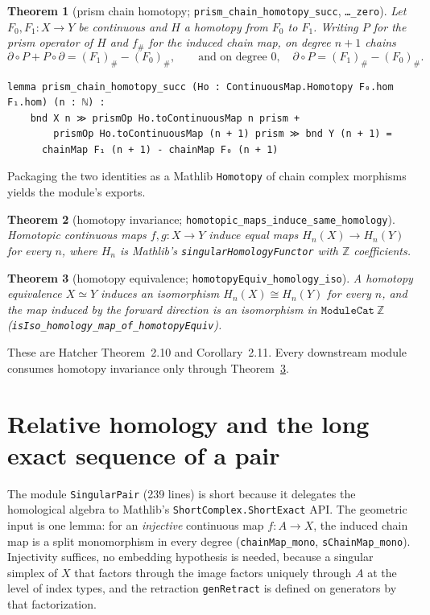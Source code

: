 \documentclass[11pt]{article}
\newtheorem{theorem}{Theorem}[section]
\theoremstyle{remark}
\newcommand{\Z}{\mathbb{Z}}
\newcommand{\leanname}[1]{\texttt{#1}}
\begin{document}
\begin{theorem}[prism chain homotopy;
\leanname{prism\_chain\_homotopy\_succ}, \leanname{\dots\_zero}]
\label{thm:prism}
Let $F_0, F_1 : X \to Y$ be continuous and $H$ a homotopy from $F_0$ to
$F_1$. Writing $P$ for the prism operator of $H$ and $f_\#$ for the induced
chain map, on degree $n+1$ chains
\[
\partial \circ P + P \circ \partial = (F_1)_\# - (F_0)_\#,
\qquad\text{and on degree } 0,\quad
\partial \circ P = (F_1)_\# - (F_0)_\#.
\]
\end{theorem}

\begin{lstlisting}
lemma prism_chain_homotopy_succ (Ho : ContinuousMap.Homotopy F₀.hom F₁.hom) (n : ℕ) :
    bnd X n ≫ prismOp Ho.toContinuousMap n prism +
        prismOp Ho.toContinuousMap (n + 1) prism ≫ bnd Y (n + 1) =
      chainMap F₁ (n + 1) - chainMap F₀ (n + 1)
\end{lstlisting}

Packaging the two identities as a Mathlib \leanname{Homotopy} of chain
complex morphisms yields the module's exports.

\begin{theorem}[homotopy invariance;
\leanname{homotopic\_maps\_induce\_same\_homology}]\label{thm:hinv}
Homotopic continuous maps $f, g : X \to Y$ induce equal maps
$H_n(X) \to H_n(Y)$ for every $n$, where $H_n$ is Mathlib's
\leanname{singularHomologyFunctor} with $\Z$ coefficients.
\end{theorem}

\begin{theorem}[homotopy equivalence;
\leanname{homotopyEquiv\_homology\_iso}]\label{thm:heq}
A homotopy equivalence $X \simeq Y$ induces an isomorphism
$H_n(X) \cong H_n(Y)$ for every $n$, and the map induced by the forward
direction is an isomorphism in $\leanname{ModuleCat}\ \Z$
(\leanname{isIso\_homology\_map\_of\_homotopyEquiv}).
\end{theorem}

These are Hatcher Theorem~2.10 and Corollary~2.11. Every downstream module
consumes homotopy invariance only through Theorem~\ref{thm:heq}.

\section{Relative homology and the long exact sequence of a pair}
\label{sec:pair}

The module \leanname{SingularPair} (239 lines) is short because it delegates
the homological algebra to Mathlib's \leanname{ShortComplex.ShortExact} API.
The geometric input is one lemma: for an \emph{injective} continuous map
$f : A \to X$, the induced chain map is a split monomorphism in every degree
(\leanname{chainMap\_mono}, \leanname{sChainMap\_mono}). Injectivity
suffices, no embedding hypothesis is needed, because a singular simplex of
$X$ that factors through the image factors uniquely through $A$ at the level
of index types, and the retraction \leanname{genRetract} is defined on
generators by that factorization.
\end{document}
